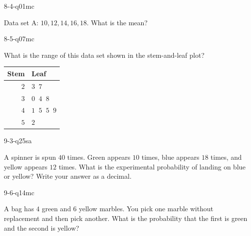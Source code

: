 \begin{practiceQuestion}{8-4-q01}{mc}
\begin{questionText}
Data set A: $10, 12, 14, 16, 18$. What is the mean?
\end{questionText}
\end{practiceQuestion}

\begin{practiceQuestion}{8-5-q07}{mc}
\begin{questionText}
What is the range of this data set shown in the stem-and-leaf plot?

\begin{center}
\begin{tabular}{r|l}
\textbf{Stem} & \textbf{Leaf} \\
\hline
$2$ & $3\;\;7$ \\
$3$ & $0\;\;4\;\;8$ \\
$4$ & $1\;\;5\;\;5\;\;9$ \\
$5$ & $2$
\end{tabular}
\end{center}
\end{questionText}
\end{practiceQuestion}

\begin{practiceQuestion}{9-3-q25}{sa}
\begin{questionText}
A spinner is spun $40$ times. Green appears $10$ times, blue appears $18$ times, and yellow appears $12$ times. What is the experimental probability of landing on blue or yellow? Write your answer as a decimal.
\end{questionText}
\end{practiceQuestion}

\begin{practiceQuestion}{9-6-q14}{mc}
\begin{questionText}
A bag has $4$ green and $6$ yellow marbles. You pick one marble without replacement and then pick another. What is the probability that the first is green and the second is yellow?
\end{questionText}
\end{practiceQuestion}

